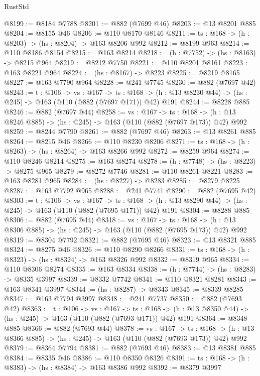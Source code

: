 \begin{lexlean}{RustStd}
\begin{coremodule}
@8199 := @8184 @7788
@8201 := @882 (@7699 @46)
@8203 := @13 @8201 @885
@8204 := @8155 @46
@8206 := @110 @8170 @8146
@8211 := {ts : @168} -> (h : @8203) -> (hs : @8204) -> @163 @8206 @992
@8212 := @8199 @963
@8214 := @110 @8186 @8154
@8215 := @163 @8214
@8218 := (h : @7752) -> (hs : @8163) -> @8215 @964
@8219 := @8212 @7750
@8221 := @110 @8201 @8161
@8223 := @163 @8221 @964
@8224 := (hs : @8167) -> @8223
@8225 := @8219 @8165
@8227 := @163 @7790 @964
@8228 := @241 @7745
@8230 := @882 (@7697 @42)
@8243 := {t : @106} ->
  {vs : @167} ->
  {ts : @168} -> (h : @13 @8230 @44) -> (hs : @245) -> @163 (@110 (@882 (@7697 @171)) @42) @191
@8244 := @8228 @885
@8246 := @882 (@7697 @44)
@8258 := {vs : @167} ->
  {ts : @168} -> (h : @13 @8246 @885) -> (hs : @245) -> @163 (@110 (@882 (@7697 @173)) @42) @992
@8259 := @8244 @7790
@8261 := @882 (@7697 @46)
@8263 := @13 @8261 @885
@8264 := @8215 @46
@8266 := @110 @8230 @8206
@8271 := {ts : @168} -> (h : @8263) -> (hs : @8264) -> @163 @8266 @992
@8272 := @8259 @964
@8274 := @110 @8246 @8214
@8275 := @163 @8274
@8278 := (h : @7748) -> (hs : @8223) -> @8275 @965
@8279 := @8272 @7746
@8281 := @110 @8261 @8221
@8283 := @163 @8281 @965
@8284 := (hs : @8227) -> @8283
@8285 := @8279 @8225
@8287 := @163 @7792 @965
@8288 := @241 @7741
@8290 := @882 (@7695 @42)
@8303 := {t : @106} ->
  {vs : @167} ->
  {ts : @168} -> (h : @13 @8290 @44) -> (hs : @245) -> @163 (@110 (@882 (@7695 @171)) @42) @191
@8304 := @8288 @885
@8306 := @882 (@7695 @44)
@8318 := {vs : @167} ->
  {ts : @168} -> (h : @13 @8306 @885) -> (hs : @245) -> @163 (@110 (@882 (@7695 @173)) @42) @992
@8319 := @8304 @7792
@8321 := @882 (@7695 @46)
@8323 := @13 @8321 @885
@8324 := @8275 @46
@8326 := @110 @8290 @8266
@8331 := {ts : @168} -> (h : @8323) -> (hs : @8324) -> @163 @8326 @992
@8332 := @8319 @965
@8334 := @110 @8306 @8274
@8335 := @163 @8334
@8338 := (h : @7744) -> (hs : @8283) -> @8335 @3997
@8339 := @8332 @7742
@8341 := @110 @8321 @8281
@8343 := @163 @8341 @3997
@8344 := (hs : @8287) -> @8343
@8345 := @8339 @8285
@8347 := @163 @7794 @3997
@8348 := @241 @7737
@8350 := @882 (@7693 @42)
@8363 := {t : @106} ->
  {vs : @167} ->
  {ts : @168} -> (h : @13 @8350 @44) -> (hs : @245) -> @163 (@110 (@882 (@7693 @171)) @42) @191
@8364 := @8348 @885
@8366 := @882 (@7693 @44)
@8378 := {vs : @167} ->
  {ts : @168} -> (h : @13 @8366 @885) -> (hs : @245) -> @163 (@110 (@882 (@7693 @173)) @42) @992
@8379 := @8364 @7794
@8381 := @882 (@7693 @46)
@8383 := @13 @8381 @885
@8384 := @8335 @46
@8386 := @110 @8350 @8326
@8391 := {ts : @168} -> (h : @8383) -> (hs : @8384) -> @163 @8386 @992
@8392 := @8379 @3997

\end{coremodule}
\end{lexlean}
